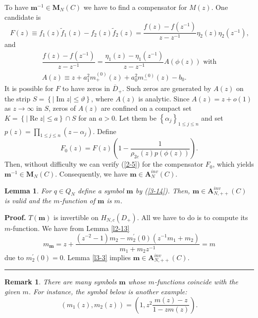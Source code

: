 \documentclass[a4paper]{article}%
\newtheorem{lemma}{Lemma}
\newtheorem{remark}{Remark}
\newenvironment{proof}[1][Proof]{\noindent\textbf{#1.} }{\ \rule{0.5em}{0.5em}}
\begin{document}
To have $\boldsymbol{m}^{-1}\in\boldsymbol{M}_{N}\left(  C\right)  $ we have
to find a compensator for $M\left(  z\right)  $. One candidate is
\[
F(z)\equiv f_{1}(z)\widetilde{f}_{1}(z)-f_{2}(z)\widetilde{f}_{2}%
(z)=\dfrac{f(z)-f(z^{-1})}{z-z^{-1}}\eta_{2}(z)\eta_{2}(z^{-1})\text{,}%
\]
and%
\begin{gather*}
\dfrac{f(z)-f(z^{-1})}{z-z^{-1}}=\dfrac{\eta_{1}(z)-\eta_{1}(z^{-1})}%
{z-z^{-1}}A(\phi\left(  z\right)  )\text{ with}\\
A(z)\equiv z+a_{1}^{2}m_{+}^{\left(  0\right)  }\left(  z\right)  +a_{0}%
^{2}m_{-}^{\left(  0\right)  }\left(  z\right)  -b_{0}\text{.}%
\end{gather*}
It is possible for $F$ to have zeros in $\overline{D}_{+}$. Such zeros are
generated by $A(z)$ on the strip $S=\left\{  \left\vert \operatorname{Im}%
z\right\vert \leq\vartheta\right\}  $, where $A(z)$ is analytic. Since
$A(z)=z+o\left(  1\right)  $ as $z\rightarrow\infty$ in $S$, zeros of $A(z)$
are confined on a compact set $K=\left\{  \left\vert \operatorname{Re}%
z\right\vert \leq a\right\}  \cap S$ for an $a>0$. Let them be $\left\{
\alpha_{j}\right\}  _{1\leq j\leq n}$ and set $p(z)=\prod_{1\leq j\leq
n}\left(  z-\alpha_{j}\right)  $. Define%
\[
F_{0}(z)=F(z)\left(  1-\dfrac{1}{\rho_{2c}\left(  z\right)  p(\phi\left(
z\right)  )}\right)  \text{.}%
\]
Then, without difficulty we can verify (\ref{2-5}) for the compensator $F_{0}%
$, which yields $\boldsymbol{m}^{-1}\in\boldsymbol{M}_{N}\left(  C\right)  $.
Consequently, we have $\boldsymbol{m}\in\boldsymbol{A}_{N}^{inv}\left(
C\right)  $.

\begin{lemma}
\label{l3-6}For $q\in Q_{N}$ define a symbol $\boldsymbol{m}$ by (\ref{3-14}).
Then, $\boldsymbol{m}\in\boldsymbol{A}_{N,++}^{inv}\left(  C\right)  $ is
valid and the $m$-function of $\boldsymbol{m}$ is $m$.
\end{lemma}

\begin{proof}
$T\left(  \boldsymbol{m}\right)  $ is invertible on $H_{N,c}\left(
D_{+}\right)  $. All we have to do is to compute its $m$-function. We have
from Lemma \ref{l2-13}%
\[
m_{\boldsymbol{m}}=z+\dfrac{\left(  z^{-2}-1\right)  m_{2}-m_{2}^{\prime
}(0)\left(  z^{-1}m_{1}+m_{2}\right)  }{m_{1}+m_{2}z^{-1}}=m
\]
due to $m_{2}^{\prime}(0)=0$. Lemma \ref{l3-3} implies $\boldsymbol{m}%
\in\boldsymbol{A}_{N,++}^{inv}\left(  C\right)  $.\bigskip
\end{proof}

\begin{remark}
\label{r2}There are many symbols $\boldsymbol{m}$ whose $m$-functions coincide
with the given $m$. For instance, the symbol below is another example:%
\[
\left(  m_{1}(z),m_{2}(z)\right)  =\left(  1,z^{2}\dfrac{m(z)-z}%
{1-zm(z)}\right)  \text{.}%
\]

\end{remark}
\end{document}
